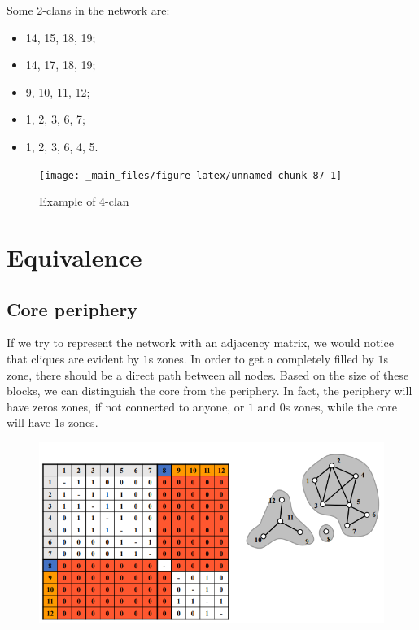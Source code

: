 \documentclass[
  notitlepage,
  onecolumn,
  openany]{book}
\providecommand{\tightlist}{%
  \setlength{\itemsep}{0pt}\setlength{\parskip}{0pt}}
\begin{document}
Some 2-clans in the network are:

\begin{itemize}
\tightlist
\item
  14, 15, 18, 19;
\item
  14, 17, 18, 19;
\item
  9, 10, 11, 12;
\item
  1, 2, 3, 6, 7;
\item
  1, 2, 3, 6, 4, 5.
\end{itemize}

\begin{figure}[h!]

{\centering \texttt{[image: \_main\_files/figure-latex/unnamed-chunk-87-1]} 

}

\caption{Example of 4-clan}\label{fig:unnamed-chunk-87}
\end{figure}

\hypertarget{equivalence}{%
\section{Equivalence}\label{equivalence}}

\hypertarget{core-periphery}{%
\subsection{Core periphery}\label{core-periphery}}

If we try to represent the network with an adjacency matrix, we would notice that cliques are evident by \(1\)s zones. In order to get a completely filled by \(1\)s zone, there should be a direct path between all nodes. Based on the size of these blocks, we can distinguish the core from the periphery. In fact, the periphery will have zeros zones, if not connected to anyone, or \(1\) and \(0\)s zones, while the core will have \(1\)s zones.

\begin{figure}[h!]

{\centering \includegraphics[width=0.6\linewidth]{images/11-Subgroups and Structural Equivalence/Untitled 3} 

}

\end{figure}
\end{document}

